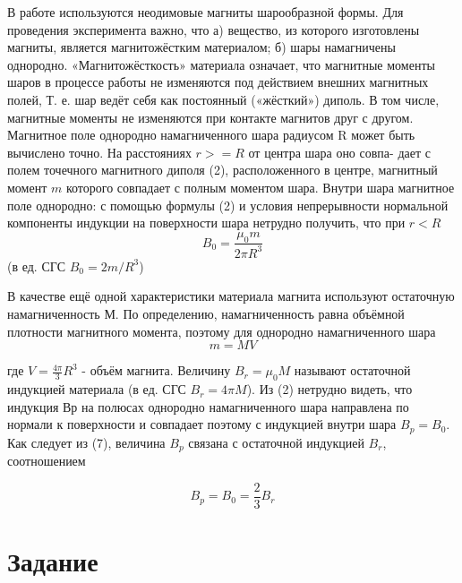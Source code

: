 \documentclass[12pt,a4paper]{article}
\begin{document}
    В работе используются неодимовые магниты шарообразной формы.
    Для проведения эксперимента важно, что а) вещество, из которого изготовлены магниты, является магнитожёстким материалом; б) шары намагничены однородно.
    «Магнитожёсткость» материала означает, что магнитные моменты шаров в процессе работы не изменяются под действием внешних магнитных полей, 
    Т. е. шар ведёт себя как постоянный («жёсткий») диполь. В том числе, магнитные моменты не изменяются при контакте магнитов друг с другом.
Магнитное поле однородно намагниченного шара радиусом R может быть вычислено точно. На расстояниях $r >= R$ от центра шара оно совпа- дает с полем точечного 
магнитного диполя (2), расположенного в центре, магнитный момент $m$ которого совпадает с полным моментом шара. Внутри шара магнитное поле однородно: с 
помощью формулы (2) и условия непрерывности нормальной компоненты индукции на поверхности шара нетрудно получить, что при $r < R$
\begin{equation}
    B_0 = \frac{\mu_{0} m}{2 \pi R^3}
\end{equation}
\label{pole}
(в ед. СГС $B_0 = 2m/R^3$)


    В качестве ещё одной характеристики материала магнита используют остаточную намагниченность $М$. По определению, намагниченность равна 
объёмной плотности магнитного момента, поэтому для однородно намагниченного шара
\begin{equation}
    m = MV
\end{equation}
\label{eight}

где $V = \frac{4\pi}{3}R^3$ - объём магнита. Величину $B_r = \mu_0 M $ называют остаточной индукцией материала (в ед. СГС $B_r = 4\pi M$).
Из (2) нетрудно видеть, что индукция Вр на полюсах однородно намагниченного шара направлена по нормали к поверхности и совпадает
поэтому с индукцией внутри шара $B_p = B_0 $. Как следует из (7), величина $B_p$ связана с остаточной индукцией $B_r$, соотношением

\begin{equation}
    B_p = B_0 = \frac{2}{3} B_r
\end{equation}
\label{ostind}

\section{Задание}
\end{document}
